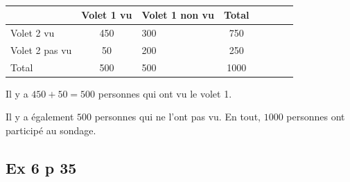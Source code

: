 \documentclass[12pt,a4paper]{book}
\begin{document}
\begin{enumMet}
	\item \,
	
	\begin{center}
		\begin{tabular}{ | Xc | Xc | Xc | Xc | }
			\hline
			
			
			& 
			
			Volet 1 vu & 
			
			Volet 1 non vu & 
			
			Total\\ \hline
			
			
			Volet 2 vu & 
			
			450 & 
			
			300 & 
			
			750\\ \hline
			
			
			Volet 2 pas vu & 
			
			50 & 
			
			200 & 
			
			250\\ \hline
			
			
			Total & 
			
			500 & 
			
			500 & 
			
			1000\\ \hline
		\end{tabular}
	\end{center}
	\item Il y a $450+50 = 500$ personnes qui ont vu le volet 1.
	\item Il y a également $500$ personnes qui ne l'ont pas vu. En tout, $1000$ personnes ont participé au sondage.
\end{enumMet}

\subsection*{Ex 6 p 35}
\end{document}
